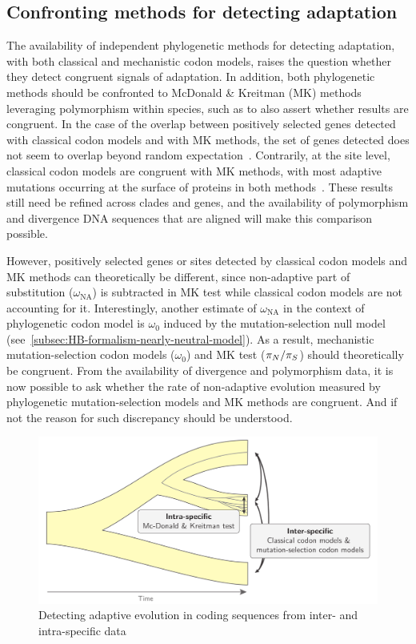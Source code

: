 \subsection{Confronting methods for detecting adaptation}
\label{subsec:confronting-methods-for-detecting-adaptation}

The availability of independent phylogenetic methods for detecting adaptation, with both classical and mechanistic codon models, raises the question whether they detect congruent signals of adaptation.
In addition, both phylogenetic methods should be confronted to McDonald \& Kreitman (MK) methods leveraging polymorphism within species, such as to also assert whether results are congruent.
In the case of the overlap between positively selected genes detected with classical codon models and with MK methods, the set of genes detected does not seem to overlap beyond random expectation~\citep{He2020}.
Contrarily, at the site level, classical codon models are congruent with MK methods, with most adaptive mutations occurring at the surface of proteins in both methods~\citep{Moutinho2019}.
These results still need be refined across clades and genes, and the availability of polymorphism and divergence DNA sequences that are aligned will make this comparison possible.

However, positively selected genes or sites detected by classical codon models and MK methods can theoretically be different, since non-adaptive part of substitution ($\omega_{\text{NA}}$) is subtracted in MK test while classical codon models are not accounting for it.
Interestingly, another estimate of $\omega_{\text{NA}}$ in the context of phylogenetic codon model is $\omega_0$ induced by the mutation-selection null model (see~\ref{subsec:HB-formalism-nearly-neutral-model}).
As a result, mechanistic mutation-selection codon models ($\omega_0$) and MK test ($\pi_N / \pi_S$) should theoretically be congruent.
From the availability of divergence and polymorphism data, it is now possible to ask whether the rate of non-adaptive evolution measured by phylogenetic mutation-selection models and MK methods are congruent.
And if not the reason for such discrepancy should be understood.

\begin{figure}[H]
    \centering
    \includegraphics[width=\textwidth] {figures/inter-intra}
    \caption{Detecting adaptive evolution in coding sequences from inter- and intra-specific data}
    \label{fig:detecting-adaptation-inter-intra}
\end{figure}

